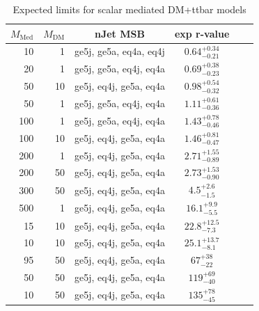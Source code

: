 \begin{table}
  \centering
  \begin{tabular}{rrcccc}
    \hline\hline
    $M_{\text{Med}}$ & $M_{\text{DM}}$ & nJet MSB & exp r-value\\
    \hline
       10 &   1 & ge5j, ge5a, eq4a, eq4j & $0.64_{-0.21}^{+0.34}$ \\ %
       20 &   1 & ge5j, ge5a, eq4j, eq4a & $0.69_{-0.23}^{+0.38}$ \\ %
       50 &  10 & ge5j, eq4j, ge5a, eq4a & $0.98_{-0.32}^{+0.54}$ \\ %
       50 &   1 & ge5j, ge5a, eq4j, eq4a & $1.11_{-0.36}^{+0.61}$ \\ %
      100 &   1 & ge5j, ge5a, eq4j, eq4a & $1.43_{-0.46}^{+0.78}$ \\ %
      100 &  10 & ge5j, eq4j, ge5a, eq4a & $1.46_{-0.47}^{+0.81}$ \\ %
      200 &   1 & ge5j, eq4j, ge5a, eq4a & $2.71_{-0.89}^{+1.55}$ \\ %
      200 &  50 & ge5j, eq4j, ge5a, eq4a & $2.73_{-0.90}^{+1.53}$ \\ %
      300 &  50 & ge5j, eq4j, ge5a, eq4a & $4.5_{-1.5}^{+2.6}$    \\ %
      500 &   1 & ge5j, eq4j, ge5a, eq4a & $16.1_{-5.5}^{+9.9}$   \\ %
       15 &  10 & ge5j, eq4j, ge5a, eq4a & $22.8_{-7.3}^{+12.5}$  \\ %
       10 &  10 & ge5j, eq4j, ge5a, eq4a & $25.1_{-8.1}^{+13.7}$  \\ %
       95 &  50 & ge5j, eq4j, ge5a, eq4a & $67_{-22}^{+38}$       \\ %
       50 &  50 & ge5j, eq4j, ge5a, eq4a & $119_{-40}^{+69}$      \\ %
       10 &  50 & ge5j, eq4j, ge5a, eq4a & $135_{-45}^{+78}$      \\ %
    \hline\hline
  \end{tabular}
  \caption{Expected limits for scalar mediated DM+ttbar models}
  \label{tab:DMttS_exp}
\end{table}

